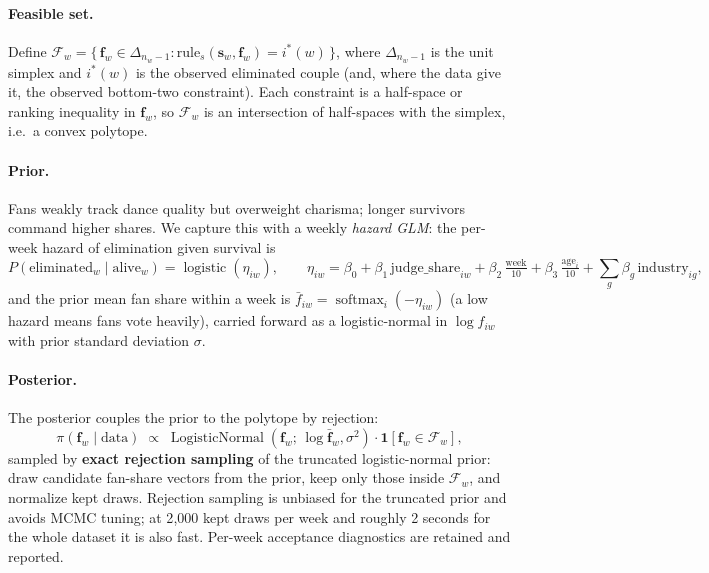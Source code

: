 \documentclass[11pt]{article}
\begin{document}
\paragraph{Feasible set.} Define
$\mathcal{F}_w = \{\, \mathbf{f}_w \in \Delta_{n_w - 1} \colon
\text{rule}_s(\mathbf{s}_w, \mathbf{f}_w) = i^{*}(w)\,\}$,
where $\Delta_{n_w-1}$ is the unit simplex and $i^{*}(w)$ is the observed
eliminated couple (and, where the data give it, the observed bottom-two
constraint). Each constraint is a half-space or ranking inequality in
$\mathbf{f}_w$, so $\mathcal{F}_w$ is an intersection of half-spaces with
the simplex, i.e.\ a convex polytope.

\paragraph{Prior.} Fans weakly track dance quality but overweight
charisma; longer survivors command higher shares. We capture this with a
weekly \emph{hazard GLM}: the per-week hazard of elimination given survival
is
\begin{equation}
P(\text{eliminated}_w \mid \text{alive}_w) = \operatorname{logistic}(\eta_{iw}),
\qquad
\eta_{iw} = \beta_0 + \beta_1 \,\text{judge\_share}_{iw}
+ \beta_2\, \tfrac{\text{week}}{10} + \beta_3\, \tfrac{\text{age}_{i}}{10}
+ \textstyle\sum_{g} \beta_{g}\, \text{industry}_{ig},
\label{eq:hazard}
\end{equation}
and the prior mean fan share within a week is
$\bar{f}_{iw} = \operatorname{softmax}_i(-\eta_{iw})$ (a low hazard means
fans vote heavily), carried forward as a logistic-normal in
$\log f_{iw}$ with prior standard deviation $\sigma$.

\paragraph{Posterior.} The posterior couples the prior to the polytope
by rejection:
\begin{equation}
\pi(\mathbf{f}_w \mid \text{data}) \;\propto\;
\operatorname{LogisticNormal}(\mathbf{f}_w;\, \log \bar{\mathbf{f}}_w, \sigma^2)
\cdot \mathbf{1}[\mathbf{f}_w \in \mathcal{F}_w],
\label{eq:posterior}
\end{equation}
sampled by \textbf{exact rejection sampling} of the truncated
logistic-normal prior: draw candidate fan-share vectors from the prior,
keep only those inside $\mathcal{F}_w$, and normalize kept draws. Rejection
sampling is unbiased for the truncated prior and avoids MCMC tuning; at
2{,}000 kept draws per week and roughly 2 seconds for the whole dataset it
is also fast. Per-week acceptance diagnostics are retained and reported.
\end{document}
